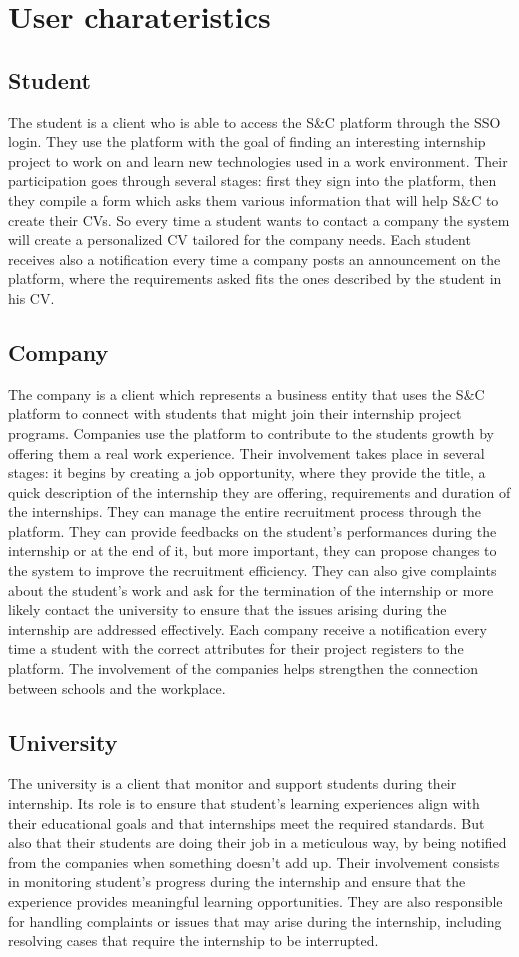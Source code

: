 \section{User charateristics}
\subsection{Student}
The student is a client who is able to access the S\&C platform through the SSO login. They use the platform with the goal of finding an interesting internship project to work on and learn new technologies used in a work environment. Their participation goes through several stages: first they sign into the platform, then they compile a form which asks them various information that will help S\&C to create their CVs. So every time a student wants to contact a company the system will create a personalized CV tailored for the company needs. Each student receives also a notification every time a company posts an announcement on the platform, where the requirements asked fits the ones described by the student in his CV.
\subsection{Company}
The company is a client which represents a business entity that uses the S\&C platform to connect with students that might join their internship project programs. Companies use the platform to contribute to the students growth by offering them a real work experience. Their involvement takes place in several stages: it begins by creating a job opportunity, where they provide the title, a quick description of the internship they are offering, requirements and duration of the internships. They can manage the entire recruitment process through the platform. They can provide feedbacks on the student’s performances during the internship or at the end of it, but more important, they can propose changes to the system to improve the recruitment efficiency. They can also give complaints about the student’s work and ask for the termination of the internship or more likely contact the university to ensure that the issues arising during the internship are addressed effectively. Each company receive a notification every time a student with the correct attributes for their project registers to the platform. The involvement of the companies helps strengthen the connection between schools and the workplace.
\subsection{University}
The university is a client that monitor and support students during their internship. Its role is to ensure that student's learning experiences align with their educational goals and that internships meet the required standards. But also that their students are doing their job in a meticulous way, by being notified from the companies when something doesn’t add up. Their involvement consists in  monitoring student's progress during the internship and ensure that the experience provides meaningful learning opportunities. They are also responsible for handling complaints or issues that may arise during the internship, including resolving cases that require the internship to be interrupted.
